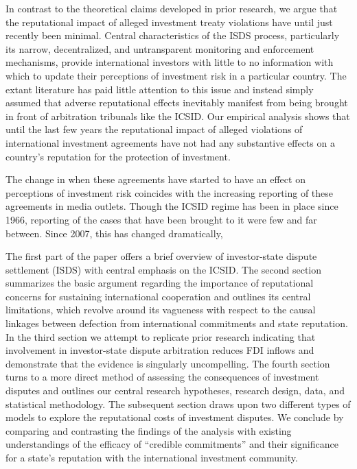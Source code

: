 \documentclass[12pt,onesided]{amsart}
\begin{document}
In contrast to the theoretical claims developed in prior research, we argue that the reputational impact of alleged investment treaty violations have until just recently been minimal. Central characteristics of the ISDS process, particularly its narrow, decentralized, and untransparent monitoring and enforcement mechanisms, provide international investors with little to no information with which to update their perceptions of investment risk in a particular country. The extant literature has paid little attention to this issue and instead simply assumed that adverse reputational effects inevitably manifest from being brought in front of arbitration tribunals like the ICSID. Our empirical analysis shows that until the last few years the reputational impact of alleged violations of international investment agreements have not had any substantive effects on a country's reputation for the protection of investment. 

The change in when these agreements have started to have an effect on perceptions of investment risk coincides with the increasing reporting of these agreements in media outlets. Though the ICSID regime has been in place since 1966, reporting of the cases that have been brought to it were few and far between. Since 2007, this has changed dramatically, 

The first part of the paper offers a brief overview of investor-state dispute settlement (ISDS) with central emphasis on the ICSID. The second section summarizes the basic argument regarding the importance of reputational concerns for sustaining international cooperation and outlines its central limitations, which revolve around its vagueness with respect to the causal linkages between defection from international commitments and state reputation. In the third section we attempt to replicate prior research indicating that involvement in investor-state dispute arbitration reduces FDI inflows and demonstrate that the evidence is singularly uncompelling. The fourth section turns to a more direct method of assessing the consequences of investment disputes and outlines our central research hypotheses, research design, data, and statistical methodology. The subsequent section draws upon two different types of models to explore the reputational costs of investment disputes. We conclude by comparing and contrasting the findings of the analysis with existing understandings of the efficacy of ``credible commitments'' and their significance for a state's reputation with the international investment community.
\end{document}

